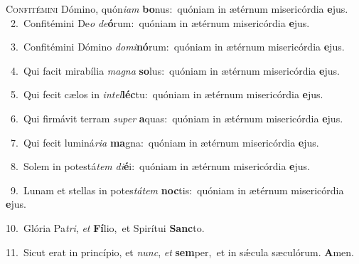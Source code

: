 \lettrine{\initial\textcolor{\initialcolor}{C}}{onfitémini} Dómino, quón\-\textit{i}\-\textit{am} \textbf{bo}\-nus:~\star quóniam in ætérnum misericórdia \textbf{e}\-jus.\\
{\numbfont\textcolor{\numbcolor}{~2.}}~Confitémini De\textit{o} \textit{de}\-\textbf{ó}rum:~\star quóniam in ætérnum misericórdia \textbf{e}\-jus.\par
{\numbfont\textcolor{\numbcolor}{~3.}}~Confitémini Dómino \textit{do}\-\textit{mi}\textbf{nó}rum:~\star quóniam in ætérnum misericórdia \textbf{e}\-jus.\par
{\numbfont\textcolor{\numbcolor}{~4.}}~Qui facit mirabília \textit{ma}\-\textit{gna} \textbf{so}\-lus:~\star quóniam in ætérnum misericórdia \textbf{e}\-jus.\par
{\numbfont\textcolor{\numbcolor}{~5.}}~Qui fecit cælos in \textit{in}\-\textit{tel}\textbf{léc}tu:~\star quóniam in ætérnum misericórdia \textbf{e}\-jus.\par
{\numbfont\textcolor{\numbcolor}{~6.}}~Qui firmávit terram \textit{su}\-\textit{per} \textbf{a}\-quas:~\star quóniam in ætérnum misericórdia \textbf{e}\-jus.\par
{\numbfont\textcolor{\numbcolor}{~7.}}~Qui fecit luminá\-\textit{ri}\-\textit{a} \textbf{ma}\-gna:~\star quóniam in ætérnum misericórdia \textbf{e}\-jus.\par
{\numbfont\textcolor{\numbcolor}{~8.}}~Solem in potestá\textit{tem} \textit{di}\-\textbf{é}i:~\star quóniam in ætérnum misericórdia \textbf{e}\-jus.\par
{\numbfont\textcolor{\numbcolor}{~9.}}~Lunam et stellas in potes\-\textit{tá}\-\textit{tem} \textbf{noc}\-tis:~\star quóniam in ætérnum misericórdia \textbf{e}\-jus.\par
{\numbfont\textcolor{\numbcolor}{10.}}~Glória Pa\-\textit{tri}\-, \textit{et} \textbf{Fí}\-lio,~\star et Spirítui \textbf{Sanc}\-to.\par
{\numbfont\textcolor{\numbcolor}{11.}}~Sicut erat in princípio, et \textit{nunc}\-, \textit{et} \textbf{sem}\-per,~\star et in sǽcula sæculórum. \textbf{A}\-men.\par
